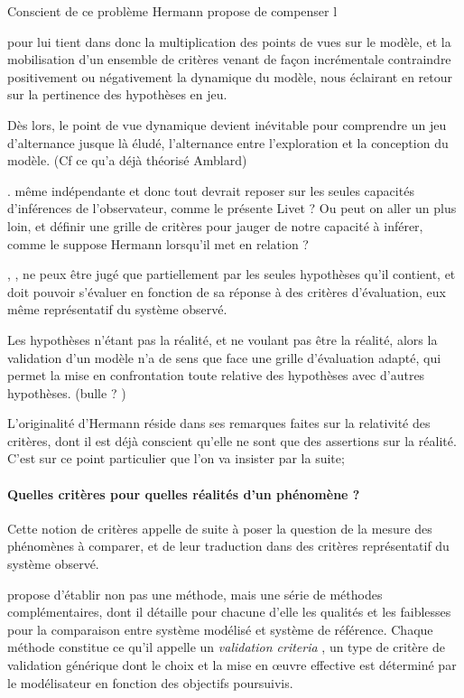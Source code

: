 Conscient de ce problème Hermann propose de compenser l

pour lui tient dans donc la multiplication des points de vues sur le modèle, et la mobilisation d'un ensemble de critères venant de façon incrémentale contraindre positivement ou négativement la dynamique du modèle, nous éclairant en retour sur la pertinence des hypothèses en jeu.

Dès lors, le point de vue dynamique devient inévitable pour comprendre un jeu d'alternance jusque là éludé, l'alternance entre l'exploration et la conception du modèle. (Cf ce qu'a déjà théorisé Amblard)


. même indépendante et donc tout devrait reposer sur les seules capacités d'inférences de l'observateur, comme le présente Livet ? Ou peut on aller un plus loin, et définir une grille de critères pour jauger de notre capacité à inférer, comme le suppose Hermann lorsqu'il met en relation  ? 

, , ne peux être jugé que partiellement par les seules hypothèses qu'il contient, et doit pouvoir s'évaluer en fonction de sa réponse à des critères d'évaluation, eux même représentatif du système observé.

Les hypothèses n'étant pas la réalité, et ne voulant pas être la réalité, alors la validation d'un modèle n'a de sens que face une grille d'évaluation adapté, qui permet la mise en confrontation toute relative des hypothèses avec d'autres hypothèses. (bulle ? )

L'originalité d'Hermann réside dans ses remarques faites sur la relativité des critères, dont il est déjà conscient qu'elle ne sont que des assertions sur la réalité.  C'est sur ce point particulier que l'on va insister par la suite;

\paragraph{Quelles critères pour quelles réalités d'un phénomène ? }

Cette notion de critères appelle de suite à poser la question de la mesure des phénomènes à comparer, et de leur traduction dans des critères représentatif du système observé.

\textcite{Hermann1967, Hermann1967b} propose d'établir non pas une méthode, mais une série de méthodes complémentaires, dont il détaille pour chacune d'elle les qualités et les faiblesses pour la comparaison entre système modélisé et système de référence. Chaque méthode constitue ce qu'il appelle un \textit{validation criteria} , un type de critère de validation générique dont le choix et la mise en œuvre effective est déterminé par le modélisateur en fonction des objectifs poursuivis.

